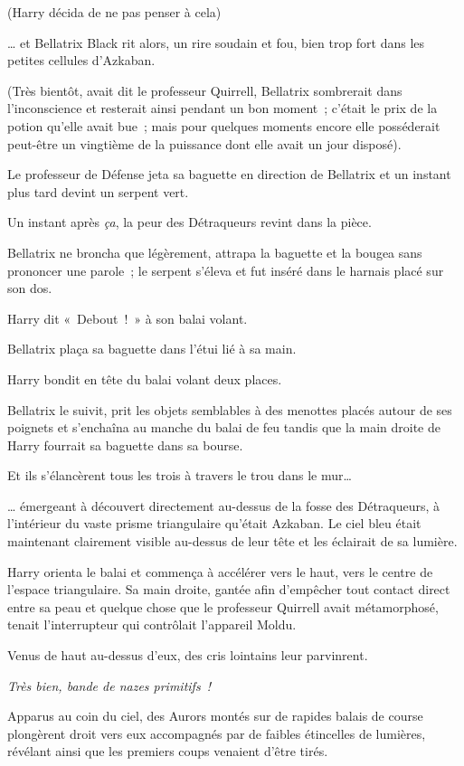 (Harry décida de ne pas penser à cela)

… et Bellatrix Black rit alors, un rire soudain et fou, bien trop fort dans les petites cellules d'Azkaban.

(Très bientôt, avait dit le professeur Quirrell, Bellatrix sombrerait dans l'inconscience et resterait ainsi pendant un bon moment~; c'était le prix de la potion qu'elle avait bue~; mais pour quelques moments encore elle posséderait peut-être un vingtième de la puissance dont elle avait un jour disposé).

Le professeur de Défense jeta sa baguette en direction de Bellatrix et un instant plus tard devint un serpent vert.

Un instant après \emph{ça}, la peur des Détraqueurs revint dans la pièce.

Bellatrix ne broncha que légèrement, attrapa la baguette et la bougea sans prononcer une parole~; le serpent s'éleva et fut inséré dans le harnais placé sur son dos.

Harry dit «~Debout~!~» à son balai volant.

Bellatrix plaça sa baguette dans l'étui lié à sa main.

Harry bondit en tête du balai volant deux places.

Bellatrix le suivit, prit les objets semblables à des menottes placés autour de ses poignets et s'enchaîna au manche du balai de feu tandis que la main droite de Harry fourrait sa baguette dans sa bourse.

Et ils s'élancèrent tous les trois à travers le trou dans le mur…

… émergeant à découvert directement au-dessus de la fosse des Détraqueurs, à l'intérieur du vaste prisme triangulaire qu'était Azkaban. Le ciel bleu était maintenant clairement visible au-dessus de leur tête et les éclairait de sa lumière.

Harry orienta le balai et commença à accélérer vers le haut, vers le centre de l'espace triangulaire. Sa main droite, gantée afin d'empêcher tout contact direct entre sa peau et quelque chose que le professeur Quirrell avait métamorphosé, tenait l'interrupteur qui contrôlait l'appareil Moldu.

Venus de haut au-dessus d'eux, des cris lointains leur parvinrent.

\emph{Très bien, bande de nazes primitifs~!}

Apparus au coin du ciel, des Aurors montés sur de rapides balais de course plongèrent droit vers eux accompagnés par de faibles étincelles de lumières, révélant ainsi que les premiers coups venaient d'être tirés.

